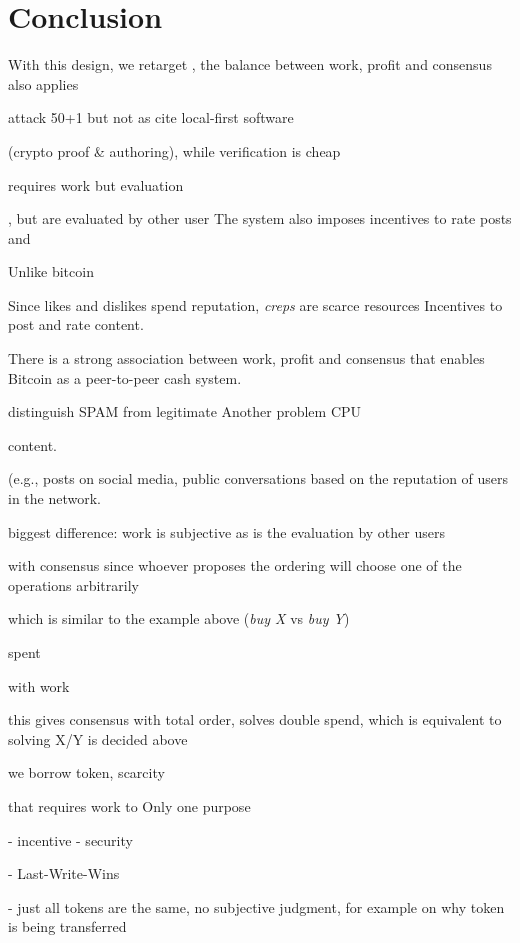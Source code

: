 \documentclass[10pt,journal,compsoc]{IEEEtran}
\begin{document}
\section{Conclusion}
\label{sec.conclusion}



With this design, we retarget  , the balance between work, profit and consensus also applies 

attack 50+1 but not as
cite local-first software

 (crypto proof \& authoring),
while verification is cheap


requires work but evaluation


, but
are evaluated by other user
The system also imposes incentives to rate posts and 

Unlike bitcoin

Since likes and dislikes spend reputation, \emph{creps} are scarce resources
Incentives to post and rate content.

There is a strong association between work, profit and consensus that enables
Bitcoin as a peer-to-peer cash system.

distinguish SPAM from legitimate
Another problem CPU



content.



 (e.g., posts on social media, public conversations
based on the reputation of users
in the network.


biggest difference:
work is subjective as is the evaluation by other users


 with consensus since
whoever proposes the ordering will choose one of the operations arbitrarily


 which is similar to the
example above (\emph{buy X} vs \emph{buy Y})

spent

with work



this gives consensus with total order, solves double spend, which is equivalent
to solving X/Y is decided above

we borrow token, scarcity


 that requires work to 
Only one purpose


- incentive
- security

- Last-Write-Wins

- just all tokens are the same, no subjective judgment, for example on why token is being transferred
\end{document}
